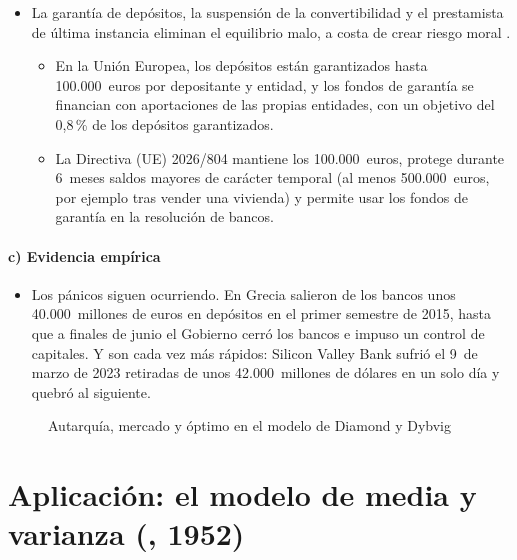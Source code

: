\documentclass[11pt]{article}
\begin{document}
\begin{itemize}
\item La garantía de depósitos, la suspensión de la convertibilidad y el prestamista de última instancia eliminan el equilibrio malo, a costa de crear riesgo moral  .
  \begin{itemize}
  \item En la Unión Europea, los depósitos están garantizados hasta 100.000~euros por depositante y entidad, y los fondos de garantía se financian con aportaciones de las propias entidades, con un objetivo del 0,8\,\% de los depósitos garantizados\nocite{UE2014DGSD,FGD2026Garantia}.
  \item La Directiva (UE) 2026/804 mantiene los 100.000~euros, protege durante 6~meses saldos mayores de carácter temporal (al menos 500.000~euros, por ejemplo tras vender una vivienda) y permite usar los fondos de garantía en la resolución de bancos\nocite{UE2026Dir804}.
  \end{itemize}
\end{itemize}

\paragraph{c) Evidencia empírica}

\begin{itemize}
\item Los pánicos siguen ocurriendo. En Grecia salieron de los bancos unos 40.000~millones de euros en depósitos en el primer semestre de 2015, hasta que a finales de junio el Gobierno cerró los bancos e impuso un control de capitales\nocite{BCE2026BSIGrecia,BIS2017Stournaras}. Y son cada vez más rápidos: Silicon Valley Bank sufrió el 9~de marzo de 2023 retiradas de unos 42.000~millones de dólares en un solo día y quebró al siguiente\nocite{FED2023SVB}.
\end{itemize}

\begin{figure}[H]
\centering
\caption{Autarquía, mercado y óptimo en el modelo de Diamond y Dybvig}\label{fig:diamond-dybvig}
\end{figure}

\section{Aplicación: el modelo de media y varianza (, 1952)}\label{anexo:media-varianza}
\end{document}
